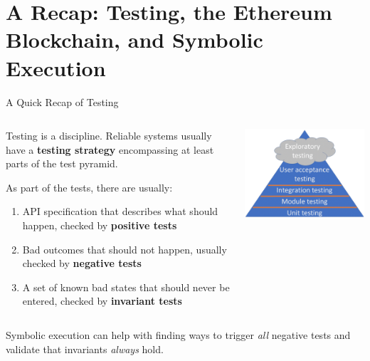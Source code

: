 \documentclass[aspectratio=169]{beamer}
\begin{document}
\section{A Recap: Testing, the Ethereum Blockchain, and Symbolic Execution}
\begin{frame}{A Quick Recap of Testing}

\begin{columns}
\begin{column}{0.7\textwidth}
   Testing is a discipline. Reliable systems usually have a \textbf{testing strategy} encompassing at least parts of the test pyramid.
   
   As part of the tests, there are usually:
   \begin{enumerate}
   \item API specification that describes what should happen, checked by 
   \textbf{positive tests}
   \item Bad outcomes that should not happen, usually checked by  \textbf{negative tests}
   \item A set of known bad states that should never be entered, checked by \textbf{invariant tests}
   \end{enumerate} 
\end{column}
\begin{column}{0.3\textwidth}  %
    \begin{center}
     \includegraphics[scale=0.45]{triangle3.png}
     \end{center}
\end{column}
\end{columns}
\bigskip


Symbolic execution can help with finding ways to trigger \emph{all} negative tests and validate that invariants \emph{always} hold.

\end{frame}
\end{document}
